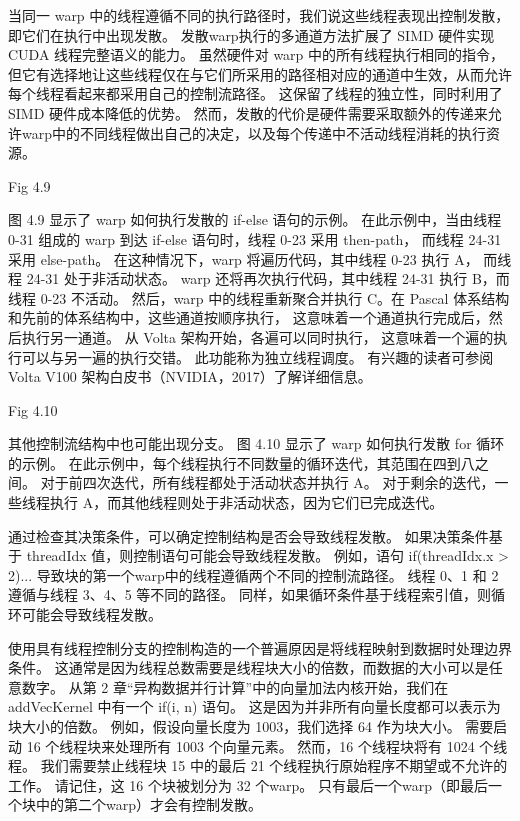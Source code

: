 当同一 warp 中的线程遵循不同的执行路径时，我们说这些线程表现出控制发散，即它们在执行中出现发散。 
发散warp执行的多通道方法扩展了 SIMD 硬件实现 CUDA 线程完整语义的能力。 虽然硬件对 warp 中的所有线程执行相同的指令，
但它有选择地让这些线程仅在与它们所采用的路径相对应的通道中生效，从而允许每个线程看起来都采用自己的控制流路径。 
这保留了线程的独立性，同时利用了 SIMD 硬件成本降低的优势。 
然而，发散的代价是硬件需要采取额外的传递来允许warp中的不同线程做出自己的决定，以及每个传递中不活动线程消耗的执行资源。

{\color{red} Fig 4.9}

图 4.9 显示了 warp 如何执行发散的 if-else 语句的示例。 
在此示例中，当由线程 0-31 组成的 warp 到达 if-else 语句时，线程 0-23 采用 then-path，
而线程 24-31 采用 else-path。 在这种情况下，warp 将遍历代码，其中线程 0-23 执行 A，
而线程 24-31 处于非活动状态。 warp 还将再次执行代码，其中线程 24-31 执行 B，而线程 0-23 不活动。 
然后，warp 中的线程重新聚合并执行 C。在 Pascal 体系结构和先前的体系结构中，这些通道按顺序执行，
这意味着一个通道执行完成后，然后执行另一通道。 从 Volta 架构开始，各遍可以同时执行，
这意味着一个遍的执行可以与另一遍的执行交错。 此功能称为独立线程调度。 
有兴趣的读者可参阅 Volta V100 架构白皮书（NVIDIA，2017）了解详细信息。

{\color{red} Fig 4.10}

其他控制流结构中也可能出现分支。 图 4.10 显示了 warp 如何执行发散 for 循环的示例。 
在此示例中，每个线程执行不同数量的循环迭代，其范围在四到八之间。 对于前四次迭代，所有线程都处于活动状态并执行 A。
对于剩余的迭代，一些线程执行 A，而其他线程则处于非活动状态，因为它们已完成迭代。

通过检查其决策条件，可以确定控制结构是否会导致线程发散。 如果决策条件基于 threadIdx 值，则控制语句可能会导致线程发散。 
例如，语句 if(threadIdx.x > 2){...} 导致块的第一个warp中的线程遵循两个不同的控制流路径。 
线程 0、1 和 2 遵循与线程 3、4、5 等不同的路径。 同样，如果循环条件基于线程索引值，则循环可能会导致线程发散。

使用具有线程控制分支的控制构造的一个普遍原因是将线程映射到数据时处理边界条件。 
这通常是因为线程总数需要是线程块大小的倍数，而数据的大小可以是任意数字。 
从第 2 章“异构数据并行计算”中的向量加法内核开始，我们在 addVecKernel 中有一个 if(i, n) 语句。 
这是因为并非所有向量长度都可以表示为块大小的倍数。 例如，假设向量长度为 1003，我们选择 64 作为块大小。 
需要启动 16 个线程块来处理所有 1003 个向量元素。 然而，16 个线程块将有 1024 个线程。 
我们需要禁止线程块 15 中的最后 21 个线程执行原始程序不期望或不允许的工作。 
请记住，这 16 个块被划分为 32 个warp。 只有最后一个warp（即最后一个块中的第二个warp）才会有控制发散。

